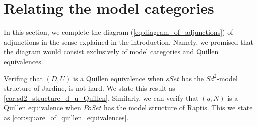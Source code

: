 

\section{Relating the model categories}
\label{sec:relations}

In this section, we complete the diagram (\ref{eq:diagram_of_adjunctions}) of adjunctions in the sense explained in the introduction. Namely, we promised that the diagram would consist exclusively of model categories and Quillen equivalences.

Verifing that $(D,U)$ is a Quillen equivalence when $sSet$ has the $Sd^2$-model structure of Jardine, is not hard. We state this result as \cref{cor:sd2_structure_d_u_Quillen}. Similarly, we can verify that $(q,N)$ is a Quillen equivalence when $PoSet$ has the model structure of Raptis. This we state as \cref{cor:square_of_quillen_equivalences}.

